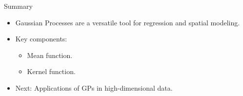 \documentclass[11pt,handout,aspectratio=169]{beamer}
\begin{document}
\begin{frame}{Summary}
\begin{itemize}
    \item Gaussian Processes are a versatile tool for regression and spatial modeling.
    \item Key components:
    \begin{itemize}
        \item Mean function.
        \item Kernel function.
    \end{itemize}
    \item Next: Applications of GPs in high-dimensional data.
\end{itemize}
\end{frame}
\end{document}
